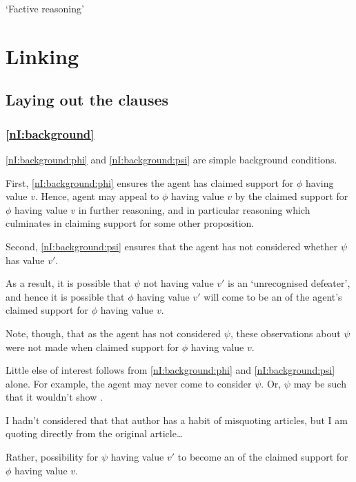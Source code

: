 \begin{note}
  `Factive reasoning'
\end{note}

\section{Linking}
\label{sec:nI:arg:linking}

\subsection{Laying out the clauses}

\subsubsection{\ref{nI:background}}

\begin{note}
\ref{nI:background:phi} and \ref{nI:background:psi} are simple background conditions.

First, \ref{nI:background:phi} ensures the agent has claimed support for \(\phi\) having value \(v\).
Hence, agent may appeal to \(\phi\) having value \(v\) by the claimed support for \(\phi\) having value \(v\) in further reasoning, and in particular reasoning which culminates in claiming support for some other proposition.

Second, \ref{nI:background:psi} ensures that the agent has not considered whether \(\psi\) has value \(v'\).

As a result, it is possible that \(\psi\) not having value \(v'\) is an `unrecognised defeater', and hence it is possible that \(\phi\) having value \(v'\) will come to be an \requ{} of the agent's claimed support for \(\phi\) having value \(v\).

Note, though, that as the agent has not considered \(\psi\), these observations about \(\psi\) were not made when claimed support for \(\phi\) having value \(v\).

Little else of interest follows from \ref{nI:background:phi} and \ref{nI:background:psi} alone.
For example, the agent may never come to consider \(\psi\).
Or, \(\psi\) may be such that it wouldn't show \mom{}.

I hadn't considered that that author has a habit of misquoting articles, but I am quoting directly from the original article\dots

Rather, possibility for \(\psi\) having value \(v'\) to become an \requ{} of the claimed support for \(\phi\) having value \(v\).
\end{note}

